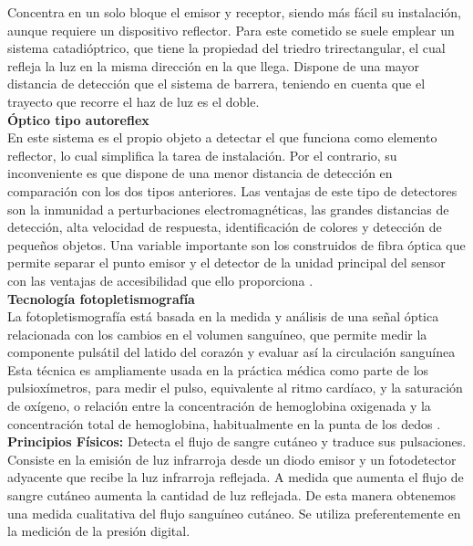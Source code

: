Concentra en un solo bloque el emisor y receptor, siendo más fácil su instalación, aunque requiere un dispositivo reflector. Para este cometido se suele emplear un sistema catadióptrico, que tiene la propiedad del triedro trirectangular, el cual refleja la luz en la misma dirección en la que llega. Dispone de una mayor distancia de detección que el sistema de barrera, teniendo en cuenta que el trayecto que recorre el haz de luz es el doble. \\

\textbf{Óptico tipo autoreflex} \\

En este sistema es el propio objeto a detectar el que funciona como elemento reflector, lo cual simplifica la tarea de instalación. Por el contrario, su inconveniente es que dispone de una menor distancia de detección en comparación con los dos tipos anteriores. Las ventajas de este tipo de detectores son la inmunidad a perturbaciones electromagnéticas, las grandes distancias de detección, alta velocidad de respuesta, identificación de colores y detección de pequeños objetos. Una variable importante son los construidos de fibra óptica que permite separar el punto emisor y el detector de la unidad principal del sensor con las ventajas de accesibilidad que ello proporciona \cite{veinticinco}. \\

\textbf{Tecnología fotopletismografía} \\

La fotopletismografía está basada en la medida y análisis de una señal óptica relacionada con los cambios en el volumen sanguíneo, que permite medir la componente pulsátil del latido del corazón y evaluar así la circulación sanguínea Esta técnica es ampliamente usada en la práctica médica como parte de los pulsioxímetros, para medir el pulso, equivalente al ritmo cardíaco, y la saturación de oxígeno, o relación entre la concentración de hemoglobina oxigenada y la concentración total de hemoglobina, habitualmente en la punta de los dedos \cite{veintiseis}. \\

\textbf{Principios Físicos:} Detecta el flujo de sangre cutáneo y traduce sus pulsaciones. Consiste en la emisión de luz infrarroja desde un diodo emisor y un fotodetector adyacente que recibe la luz infrarroja reflejada. A medida que aumenta el flujo de sangre cutáneo aumenta la cantidad de luz reflejada. De esta manera obtenemos una medida cualitativa del flujo sanguíneo cutáneo. Se utiliza preferentemente en la medición de la presión digital. \\

